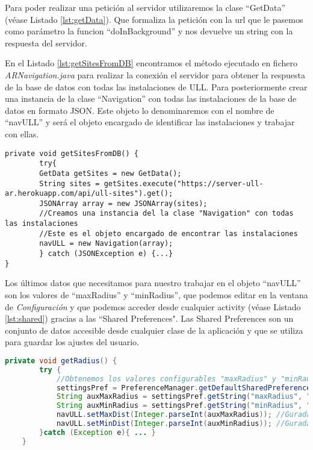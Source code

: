 Para poder realizar una petición al servidor utilizaremos la clase ``GetData'' (véase Listado \ref{lst:getData}). Que formaliza la petición con la url que le pasemos como parámetro la funcion ``doInBackground'' y nos devuelve un string con la respuesta del servidor. 

 

En el Listado \ref{lst:getSitesFromDB} encontramos el método ejecutado en fichero \textit{ARNavigation.java} para realizar la conexión el servidor para obtener la respuesta de la base de datos con todas las instalaciones de ULL. Para posteriormente crear una instancia de la clase ``Navigation'' con todas las instalaciones de la base de datos en formato JSON. Este objeto lo denominaremos con el nombre de ``navULL'' y será el objeto encargado de identificar las instalaciones y trabajar con ellas.
\begin{lstlisting}[caption={Método que conecta con el servidor y recibe la respuesta con todas las instalaciones de la base de datos.},  label={lst:getSitesFromDB}]
    private void getSitesFromDB() {
        try{
        GetData getSites = new GetData();
        String sites = getSites.execute("https://server-ull-ar.herokuapp.com/api/ull-sites").get();
        JSONArray array = new JSONArray(sites);
        //Creamos una instancia del la clase "Navigation" con todas las instalaciones
        //Este es el objeto encargado de encontrar las instalaciones
        navULL = new Navigation(array); 
        } catch (JSONException e) {...}
}
\end{lstlisting}

Los últimos datos que necesitamos para nuestro trabajar en el objeto ``navULL'' son los valores de ``maxRadius'' y ``minRadius'', que podemos editar en la ventana de \textit{Configuración} y que podemos acceder desde cualquier activity (véase Listado \ref{lst:shared}) gracias a las ``Shared Preferences". Las Shared Preferences son un conjunto de datos accesible desde cualquier clase de la aplicación y que se utiliza para guardar los ajustes del usuario.

\begin{lstlisting}[language=java, caption={Ficher \textit{ARNavigation.java}, Código que se encarga de guardar los valores de ``maxDist'' y ``minDist'' del objeto ``navULL''},  label={lst:shared}]
    private void getRadius() {
        try {
            //Obtenemos los valores configurables "maxRadius" y "minRadius" en la ventana de "Configuracion"
            settingsPref = PreferenceManager.getDefaultSharedPreferences(getContext());
            String auxMaxRadius = settingsPref.getString("maxRadius", "null");
            String auxMinRadius = settingsPref.getString("minRadius", "null");
            navULL.setMaxDist(Integer.parseInt(auxMaxRadius)); //Guradamos el valor "maxRadius"
            navULL.setMinDist(Integer.parseInt(auxMinRadius)); //Guradamos el valor "minRadius"
        }catch (Exception e){ ... }
    }
\end{lstlisting}


